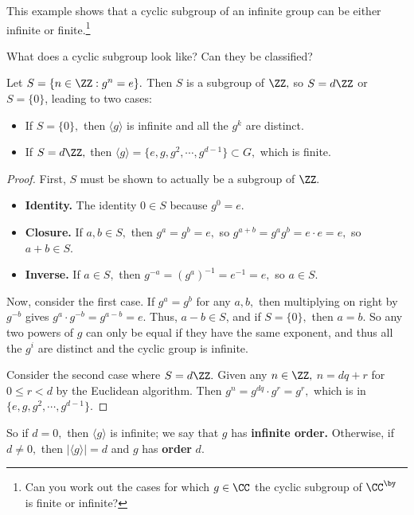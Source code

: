 This example shows that a cyclic subgroup of an infinite group can be either infinite or finite.\footnote{Can you work out the cases for which $g \in \CC$ the cyclic subgroup of $\CC^{\by}$ is finite or infinite?}

\begin{qq}
What does a cyclic subgroup look like? Can they be classified?
\end{qq}

\begin{theorem}
Let $S = \{n \in \ZZ: g^n = e\}.$ Then $S$ is a subgroup of $\ZZ,$ so $S = d\ZZ$ or $S = \{0\}$, leading to two cases:
\begin{itemize}
    \item If $S = \{0\},$ then $\langle g \rangle$ is infinite and all the $g^k$ are distinct.
    \item If $S = d\ZZ,$ then $\langle g \rangle = \{e, g, g^2, \cdots, g^{d-1}\} \subset G,$ which is finite.
\end{itemize}
\end{theorem}
\begin{proof}
First, $S$ must be shown to actually be a subgroup of $\ZZ.$
\begin{itemize}
    \item \textbf{Identity.} The identity $0 \in S$ because $g^0 = e.$
    \item \textbf{Closure.} If $a, b \in S,$ then $g^a = g^b = e,$ so $g^{a + b} = g^ag^b = e \cdot e = e,$ so $a + b \in S.$
    \item \textbf{Inverse.} If $a \in S,$ then $g^{-a} = (g^a)^{-1} = e^{-1} = e,$ so $a \in S.$
    
\end{itemize}

Now, consider the first case. If $g^a = g^b$ for any $a, b,$ then multiplying on right by $g^{-b}$ gives $g^a\cdot g^{-b} = g^{a-b} = e.$ Thus, $a - b \in S$, and if $S = \{0\},$ then $a = b.$ So any two powers of $g$ can only be equal if they have the same exponent, and thus all the $g^i$ are distinct and the cyclic group is infinite. 

Consider the second case where $S = d\ZZ.$ Given any $n \in \ZZ,$ $n = dq + r$ for $0 \leq r < d$ by the Euclidean algorithm. Then $g^n = g^{dq} \cdot g^r = g^r,$ which is in $\{e, g, g^2, \cdots, g^{d-1}\}.$
\end{proof}

\begin{definition}
So if $d = 0,$ then $\langle g \rangle$ is infinite; we say that $g$ has \textbf{infinite order.} Otherwise, if $d \neq 0,$ then $|\langle g \rangle| = d$ and $g$ has \textbf{order} $d$.
\end{definition}

